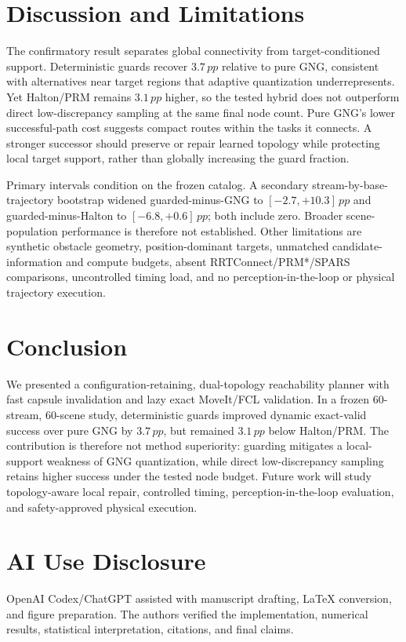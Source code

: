 \documentclass[letterpaper,10pt,conference]{ieeeconf}
\newcommand{\pp}{\,pp}
\begin{document}
\section{Discussion and Limitations}
The confirmatory result separates global connectivity from target-conditioned support. Deterministic guards recover $3.7\pp$ relative to pure GNG, consistent with alternatives near target regions that adaptive quantization underrepresents. Yet Halton/PRM remains $3.1\pp$ higher, so the tested hybrid does not outperform direct low-discrepancy sampling at the same final node count. Pure GNG's lower successful-path cost suggests compact routes within the tasks it connects. A stronger successor should preserve or repair learned topology while protecting local target support, rather than globally increasing the guard fraction.

Primary intervals condition on the frozen catalog. A secondary stream-by-base-trajectory bootstrap widened guarded-minus-GNG to $[-2.7,+10.3]\pp$ and guarded-minus-Halton to $[-6.8,+0.6]\pp$; both include zero. Broader scene-population performance is therefore not established. Other limitations are synthetic obstacle geometry, position-dominant targets, unmatched candidate-information and compute budgets, absent RRTConnect/PRM*/SPARS comparisons, uncontrolled timing load, and no perception-in-the-loop or physical trajectory execution.

\section{Conclusion}
We presented a configuration-retaining, dual-topology reachability planner with fast capsule invalidation and lazy exact MoveIt/FCL validation. In a frozen 60-stream, 60-scene study, deterministic guards improved dynamic exact-valid success over pure GNG by $3.7\pp$, but remained $3.1\pp$ below Halton/PRM. The contribution is therefore not method superiority: guarding mitigates a local-support weakness of GNG quantization, while direct low-discrepancy sampling retains higher success under the tested node budget. Future work will study topology-aware local repair, controlled timing, perception-in-the-loop evaluation, and safety-approved physical execution.

\section*{AI Use Disclosure}
OpenAI Codex/ChatGPT assisted with manuscript drafting, LaTeX conversion, and figure preparation. The authors verified the implementation, numerical results, statistical interpretation, citations, and final claims.



\end{document}
